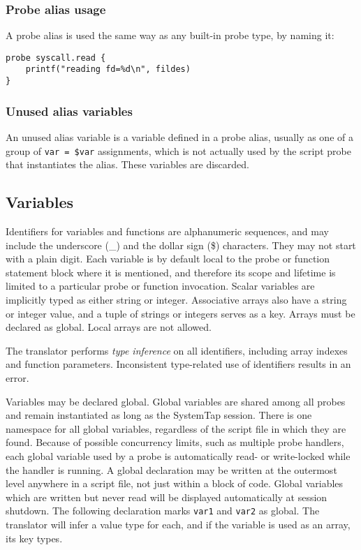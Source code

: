 \documentclass[twoside,english]{article}
\newenvironment{vindent}
{\begin{list}{}{\setlength{\listparindent}{6pt}}
\item[]}
{\end{list}}
\begin{document}
\subsubsection{Probe alias usage}

A probe alias is used the same way as any built-in probe type, by
naming it:

\begin{vindent}
\begin{verbatim}
probe syscall.read {
    printf("reading fd=%d\n", fildes)
}
\end{verbatim}
\end{vindent}

\subsubsection{Unused alias variables}
An unused alias variable is a variable defined in a probe alias, usually
as one of a group of \texttt{var = \$var} assignments, which is not actually
used by the script probe that instantiates the alias. These variables are
discarded.

\subsection{Variables\label{sub:Variables}}
Identifiers for variables and functions are alphanumeric sequences, and may
include the underscore (\_) and the dollar sign (\$) characters. They may
not start with a plain digit. Each variable is by default local to the probe
or function statement block where it is mentioned, and therefore its scope
and lifetime is limited to a particular probe or function invocation. Scalar
variables are implicitly typed as either string or integer. Associative arrays
also have a string or integer value, and a tuple of strings or integers serves
as a key. Arrays must be declared as global. Local arrays
are not allowed.

The translator performs \emph{type inference} on all identifiers, including
array indexes and function parameters. Inconsistent type-related use of identifiers
results in an error.

Variables may be declared global. Global variables are shared among all probes
and remain instantiated as long as the SystemTap session. There is one namespace
for all global variables, regardless of the script file in which they are
found. Because of possible concurrency limits, such as multiple probe handlers,
each global variable used by a probe is automatically read- or write-locked
while the handler is running. A global declaration may be written at the
outermost level anywhere in a script file, not just within a block of code.
Global variables which are written but never read will be displayed
automatically at session shutdown.  The following declaration marks
\texttt{var1} and \texttt{var2} as global.
The translator will infer a value type for each, and if the variable is used
as an array, its key types.
\end{document}
